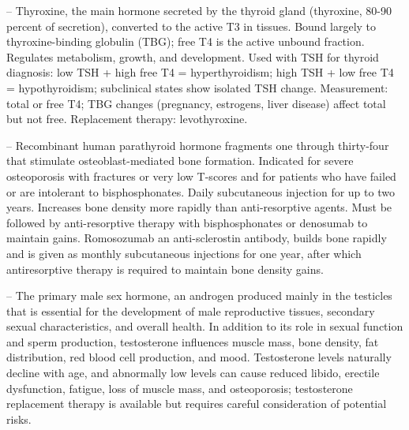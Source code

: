 -- Thyroxine, the main hormone secreted by the thyroid gland (thyroxine, 80-90 percent of secretion), converted to the active T3 in tissues. Bound largely to thyroxine-binding globulin (TBG); free T4 is the active unbound fraction. Regulates metabolism, growth, and development. Used with TSH for thyroid diagnosis: low TSH + high free T4 = hyperthyroidism; high TSH + low free T4 = hypothyroidism; subclinical states show isolated TSH change. Measurement: total or free T4; TBG changes (pregnancy, estrogens, liver disease) affect total but not free. Replacement therapy: levothyroxine.

-- Recombinant human parathyroid hormone fragments one through thirty-four that stimulate osteoblast-mediated bone formation. Indicated for severe osteoporosis with fractures or very low T-scores and for patients who have failed or are intolerant to bisphosphonates. Daily subcutaneous injection for up to two years. Increases bone density more rapidly than anti-resorptive agents. Must be followed by anti-resorptive therapy with bisphosphonates or denosumab to maintain gains. Romosozumab an anti-sclerostin antibody, builds bone rapidly and is given as monthly subcutaneous injections for one year, after which antiresorptive therapy is required to maintain bone density gains.

-- The primary male sex hormone, an androgen produced mainly in the testicles that is essential for the development of male reproductive tissues, secondary sexual characteristics, and overall health. In addition to its role in sexual function and sperm production, testosterone influences muscle mass, bone density, fat distribution, red blood cell production, and mood. Testosterone levels naturally decline with age, and abnormally low levels can cause reduced libido, erectile dysfunction, fatigue, loss of muscle mass, and osteoporosis; testosterone replacement therapy is available but requires careful consideration of potential risks.

